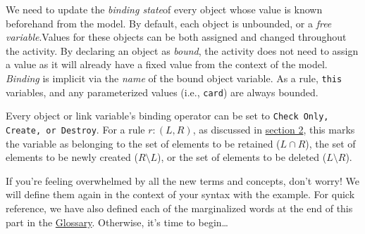 We need to update the \emph{binding state}of every object whose value is known beforehand from the model. By default, each object is
unbounded, or a \emph{free variable}.Values for these objects can be both assigned and changed throughout the activity. By declaring
an object as \emph{bound}, the activity does not need to assign a value as it will already have a fixed value from the context of the model. \emph{Binding} is
implicit via the \emph{name} of the bound object variable. As a rule, \texttt{this} variables, and any parameterized values (i.e.,
\texttt{card}) are always bounded.

Every object or link variable's binding operator can be set to \texttt{Check Only, Create, or Destroy}. For a rule $r: (L, R)$, as discussed in
\hyperlink{explanation}{section 2}, this marks the variable as belonging to the set of elements to be retained ($L\cap R$), the set of elements to be newly
created ($R\setminus L$), or the set of elements to be deleted ($L\setminus R$).

If you're feeling overwhelmed by all the new terms and concepts, don't worry! We will define them again in the context of your syntax with the example. For
quick reference, we have also defined each of the marginalized words at the end of this part in the \hyperlink{glossary}{Glossary}. Otherwise, it's time
to begin\ldots






